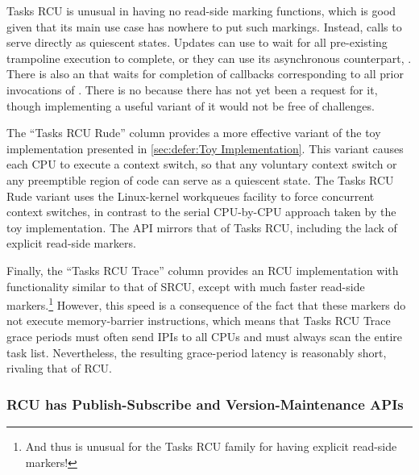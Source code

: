 Tasks RCU is unusual in having no read-side marking functions, which
is good given that its main use case has nowhere to put such markings.
Instead, calls to  serve directly as quiescent states.
Updates can use  to wait for all pre-existing
trampoline execution to complete, or they can use its asynchronous
counterpart, .
There is also an  that waits for completion
of callbacks corresponding to all prior invocations of .
There is no  because there has
not yet been a request for it, though implementing a useful variant of
it would not be free of challenges.

\QuickQuizEnd

The ``Tasks RCU Rude'' column provides a more effective variant
of the toy implementation presented in
\cref{sec:defer:Toy Implementation}.
This variant causes each CPU to execute a context switch,
so that any voluntary context switch or any preemptible region of
code can serve as a quiescent state.
The Tasks RCU Rude variant uses the Linux-kernel workqueues facility to
force concurrent context switches, in contrast to the serial
CPU-by-CPU approach taken by the toy implementation.
The API mirrors that of Tasks RCU, including the lack of explicit
read-side markers.

Finally, the ``Tasks RCU Trace'' column provides an RCU implementation
with functionality similar to that of SRCU, except with much faster
read-side markers.\footnote{
	And thus is unusual for the Tasks RCU family for having
	explicit read-side markers!}
However, this speed is a consequence of the fact that these markers
do not execute memory-barrier instructions, which means that Tasks RCU
Trace grace periods must often send IPIs to all CPUs and must always
scan the entire task list.
Nevertheless, the resulting grace-period latency is reasonably short,
rivaling that of RCU\@.

\subsubsection{RCU has Publish-Subscribe and Version-Maintenance APIs}
\label{sec:defer:RCU has Publish-Subscribe and Version-Maintenance APIs}

